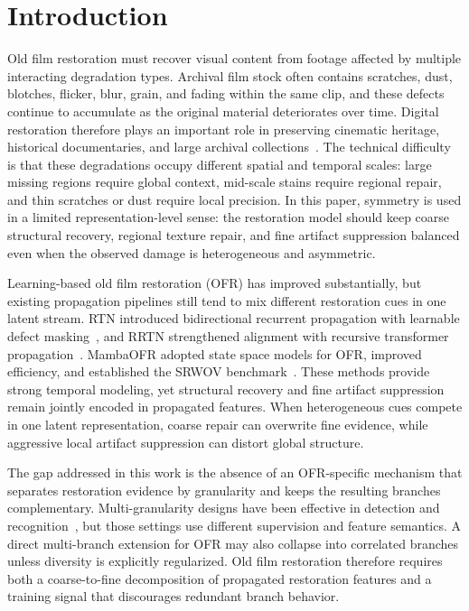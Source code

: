 \section{Introduction}
\label{sec:introduction}

Old film restoration must recover visual content from footage affected by multiple interacting degradation types. Archival film stock often contains scratches, dust, blotches, flicker, blur, grain, and fading within the same clip, and these defects continue to accumulate as the original material deteriorates over time. Digital restoration therefore plays an important role in preserving cinematic heritage, historical documentaries, and large archival collections~\cite{iizuka2019deepremaster}. The technical difficulty is that these degradations occupy different spatial and temporal scales: large missing regions require global context, mid-scale stains require regional repair, and thin scratches or dust require local precision. In this paper, symmetry is used in a limited representation-level sense: the restoration model should keep coarse structural recovery, regional texture repair, and fine artifact suppression balanced even when the observed damage is heterogeneous and asymmetric.

Learning-based old film restoration (OFR) has improved substantially, but existing propagation pipelines still tend to mix different restoration cues in one latent stream. RTN introduced bidirectional recurrent propagation with learnable defect masking~\cite{wan2022rtn}, and RRTN strengthened alignment with recursive transformer propagation~\cite{lin2024rrtn}. MambaOFR adopted state space models for OFR, improved efficiency, and established the SRWOV benchmark~\cite{mao2025mambaofr,gu2024mamba,guo2024mambair}. These methods provide strong temporal modeling, yet structural recovery and fine artifact suppression remain jointly encoded in propagated features. When heterogeneous cues compete in one latent representation, coarse repair can overwrite fine evidence, while aggressive local artifact suppression can distort global structure.

The gap addressed in this work is the absence of an OFR-specific mechanism that separates restoration evidence by granularity and keeps the resulting branches complementary. Multi-granularity designs have been effective in detection and recognition~\cite{lin2017fpn,wang2021hrnet,sun2018pcb,wang2018mgn,gu2025reidmamba}, but those settings use different supervision and feature semantics. A direct multi-branch extension for OFR may also collapse into correlated branches unless diversity is explicitly regularized. Old film restoration therefore requires both a coarse-to-fine decomposition of propagated restoration features and a training signal that discourages redundant branch behavior.

